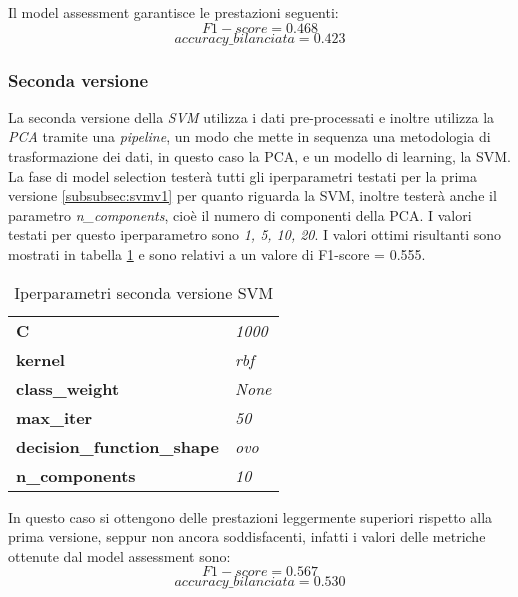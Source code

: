 Il model assessment garantisce le prestazioni seguenti:
$$F1-score = 0.468$$
$$accuracy\_bilanciata = 0.423$$

\subsubsection{Seconda versione}\label{subsubsec:svmv2}
La seconda versione della \textit{SVM} utilizza i dati pre-processati e inoltre utilizza la \textit{PCA} tramite una \textit{pipeline}, un modo che mette in sequenza una metodologia di trasformazione dei dati, in questo caso la PCA, e un modello di learning, la SVM. La fase di model selection testerà tutti gli iperparametri testati per la prima versione \ref{subsubsec:svmv1} per quanto riguarda la SVM, inoltre testerà anche il parametro \textit{n\_components}, cioè il numero di componenti della PCA. I valori testati per questo iperparametro sono \textit{1, 5, 10, 20}.
I valori ottimi risultanti sono mostrati in tabella \ref{tab:svmv2} e sono relativi a un valore di F1-score = 0.555.

\begin{table}[h] 
\centering
\begin{tabular}{l l}
\hline
\textbf{C} & \textit{1000}\\
\textbf{kernel} & \textit{rbf}\\
\textbf{class\_weight} & \textit{None}\\
\textbf{max\_iter} & \textit{50}\\
\textbf{decision\_function\_shape} & \textit{ovo}\\
\textbf{n\_components} & \textit{10}\\
\hline
\end{tabular}
\caption{Iperparametri seconda versione SVM}
\label{tab:svmv2}
\end{table}

In questo caso si ottengono delle prestazioni leggermente superiori rispetto alla prima versione,  seppur non ancora soddisfacenti, infatti i valori delle metriche ottenute dal model assessment sono:
$$F1-score = 0.567$$
$$accuracy\_bilanciata = 0.530$$

